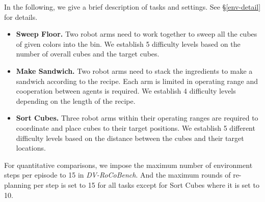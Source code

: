 \documentclass[11pt]{article}
\theoremstyle{plain}
\theoremstyle{remark}
\begin{document}
In the following, we give a brief description of tasks and settings. See \S\ref{env-detail} for details.
\begin{itemize}[nosep,leftmargin=1em,labelwidth=*,align=left]
    \item[-] \textbf{Sweep Floor.} Two robot arms need to work together to sweep all the cubes of given colors into the bin. We establish 5 difficulty levels based on the number of overall cubes and the target cubes.
    \item[-] \textbf{Make Sandwich.} Two robot arms need to stack the ingredients to make a sandwich according to the recipe. Each arm is limited in operating range and cooperation between agents is required. We establish 4 difficulty levels depending on the length of the recipe.
    \item[-] \textbf{Sort Cubes.} Three robot arms within their operating ranges are required to coordinate and place cubes to their target positions. We establish 5 different difficulty levels based on the distance between the cubes and their target locations.
\end{itemize}

For quantitative comparisons, we impose the maximum number of environment steps per episode to 15 in \emph{DV-RoCoBench}.
And the maximum rounds of re-planning per step is set to 15 for all tasks except for Sort Cubes where it is set to 10.
\end{document}
